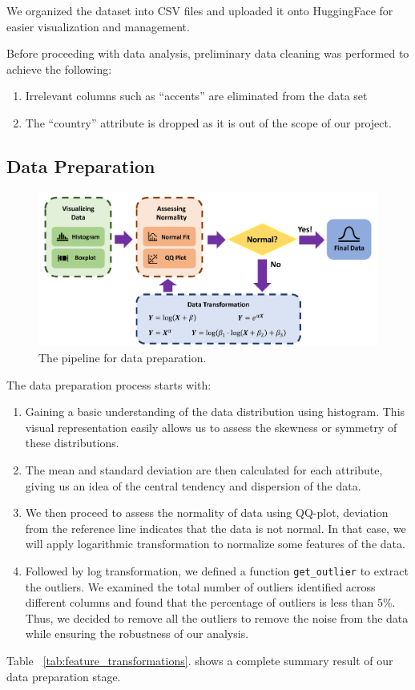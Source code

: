 \documentclass{article}
\begin{document}
	We organized the dataset into CSV files and uploaded it onto HuggingFace for easier visualization and management.
	
	Before proceeding with data analysis, preliminary data cleaning was performed to achieve the following:
	\begin{enumerate}
		\item Irrelevant columns such as ``accents'' are eliminated from the data set
		\item The ``country'' attribute is dropped as it is out of the scope of our project.
	\end{enumerate}
	
	
	\subsection{Data Preparation}
	\begin{figure}
		\centering
		\includegraphics[width=\textwidth]{graphs/prepare_data.pdf}
		\caption{The pipeline for data preparation.}
		\label{data_prep}
	\end{figure}
	The data preparation process starts with:
	\begin{enumerate}
		\item Gaining a basic understanding of the data distribution using histogram. This visual representation easily allows us to assess the skewness or symmetry of these distributions.
		\item The mean and standard deviation are then calculated for each attribute, giving us an idea of the central tendency and dispersion of the data. 
		\item We then proceed to assess the normality of data using QQ-plot, deviation from the reference line indicates that the data is not normal. In that case, we will apply logarithmic transformation to normalize some features of the data. 
		\item Followed by log transformation, we defined a function \texttt{get\_outlier} to extract the outliers. We examined the total number of outliers identified across different columns and found that the percentage of outliers is less than 5\%. Thus, we decided to remove all the outliers to remove the noise from the data while ensuring the robustness of our analysis.
	\end{enumerate}
	Table ~\ref{tab:feature_transformations}. shows a complete summary result of our data preparation stage.
\end{document}
